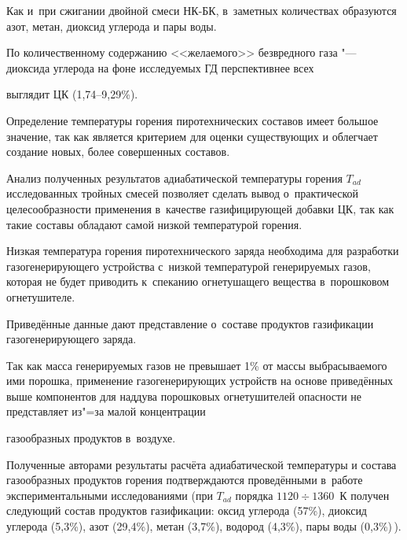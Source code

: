 Как и~при сжигании двойной смеси НК-БК, в~заметных количествах образуются азот, метан, диоксид углерода и пары воды.

По количественному содержанию <<желаемого>> безвредного газа "--- диоксида углерода на фоне исследуемых ГД перспективнее всех

выглядит ЦК (1,74--9,29{\%}).











\smallskip




Определение температуры горения пиротехнических составов имеет большое значение, так как является критерием для оценки существующих и облегчает создание новых, более совершенных составов.



Анализ полученных результатов адиабатической температуры горения $T_{ad}$ исследованных тройных смесей позволяет сделать вывод о~практической целесообразности применения в~качестве газифицирующей добавки ЦК, так как такие составы обладают самой низкой температурой горения.

Низкая температура горения пиротехнического заряда необходима для разработки газогенерирующего устройства с~низкой температурой генерируемых газов, которая не будет приводить к~спеканию огнетушащего вещества в~порошковом огнетушителе.



Приведённые данные дают представление о~составе продуктов газификации газогенерирующего заряда. 

Так как масса генерируемых газов не превышает 1{\%} от массы выбрасываемого ими порошка, применение газогенерирующих устройств на основе приведённых выше компонентов для наддува порошковых огнетушителей опасности не представляет из"=за малой концентрации

газообразных продуктов в~воздухе.



Полученные авторами результаты расчёта адиабатической температуры и состава газообразных продуктов горения подтверждаются проведёнными в~работе~\cite{altuhov:bib12} экспериментальными исследованиями (при $T_{ad}$  порядка $1120\div1360$~К получен следующий состав продуктов газификации: оксид углерода (57{\%}), диоксид углерода (5,3{\%}), азот (29,4{\%}), метан (3,7{\%}), водород  (4,3{\%}), пары воды (0,3{\%})\,). 


